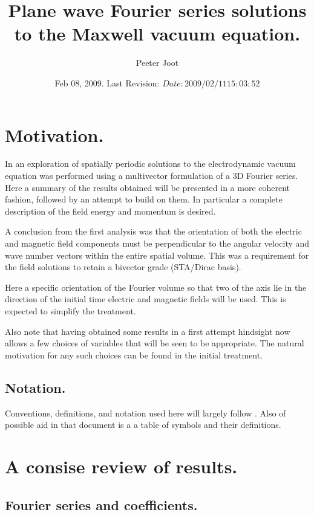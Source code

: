 \documentclass{article}
\title{ Plane wave Fourier series solutions to the Maxwell vacuum equation. }
\author{Peeter Joot}
\date{ Feb 08, 2009.  Last Revision: $Date: 2009/02/11 15:03:52 $ }
\begin{document}
\maketitle{}
\tableofcontents

\section{ Motivation. }

In \cite{PJFourierVacuum} an exploration of spatially periodic solutions to the electrodynamic vacuum equation was performed using a multivector formulation
of a 3D Fourier series.
Here a summary of the results obtained will be presented in a more
coherent fashion, followed by an attempt to build on them.
In particular a complete
description of the field energy and momentum is desired.

A conclusion from the first analysis was that the
orientation of both the electric and magnetic field components
must be perpendicular to the angular velocity and wave number vectors
within the entire spatial volume.  This was a requirement for the field
solutions to retain a bivector grade (STA/Dirac basis).

Here a specific orientation of the Fourier volume so that two of the axis
lie in the direction of the initial time electric and magnetic fields will be
used.  This is expected to simplify the treatment.

Also note that having obtained some results in a first attempt hindsight
now allows a few choices of variables that will be seen to be appropriate.
The natural motivation for any such choices can be found in the initial
treatment.

\subsection{ Notation. }

Conventions, definitions, and notation used here will largely follow
\cite{PJFourierVacuum}.  Also of possible aid in that document is a
a table of symbols and their definitions.

\section{ A consise review of results. }

\subsection{ Fourier series and coefficients. }
\end{document}
